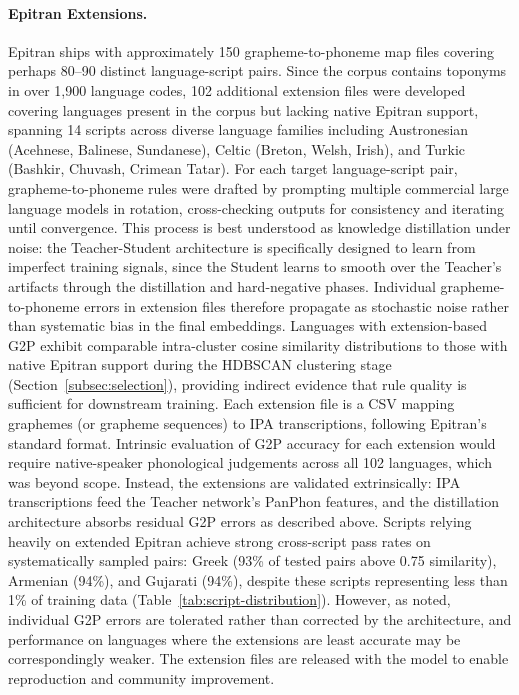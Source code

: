 \documentclass[11pt,a4paper]{article}
\begin{document}
\paragraph{Epitran Extensions.} Epitran ships with approximately 150 grapheme-to-phoneme map files covering perhaps 80--90 distinct language-script pairs. Since the corpus contains toponyms in over 1,900 language codes, 102 additional extension files were developed covering languages present in the corpus but lacking native Epitran support, spanning 14 scripts across diverse language families including Austronesian (Acehnese, Balinese, Sundanese), Celtic (Breton, Welsh, Irish), and Turkic (Bashkir, Chuvash, Crimean Tatar). For each target language-script pair, grapheme-to-phoneme rules were drafted by prompting multiple commercial large language models in rotation, cross-checking outputs for consistency and iterating until convergence. This process is best understood as knowledge distillation under noise: the Teacher-Student architecture is specifically designed to learn from imperfect training signals, since the Student learns to smooth over the Teacher's artifacts through the distillation and hard-negative phases. Individual grapheme-to-phoneme errors in extension files therefore propagate as stochastic noise rather than systematic bias in the final embeddings. Languages with extension-based G2P exhibit comparable intra-cluster cosine similarity distributions to those with native Epitran support during the HDBSCAN clustering stage (Section~\ref{subsec:selection}), providing indirect evidence that rule quality is sufficient for downstream training. Each extension file is a CSV mapping graphemes (or grapheme sequences) to IPA transcriptions, following Epitran's standard format. Intrinsic evaluation of G2P accuracy for each extension would require native-speaker phonological judgements across all 102 languages, which was beyond scope. Instead, the extensions are validated extrinsically: IPA transcriptions feed the Teacher network's PanPhon features, and the distillation architecture absorbs residual G2P errors as described above. Scripts relying heavily on extended Epitran achieve strong cross-script pass rates on systematically sampled pairs: Greek (93\% of tested pairs above 0.75 similarity), Armenian (94\%), and Gujarati (94\%), despite these scripts representing less than 1\% of training data (Table~\ref{tab:script-distribution}). However, as noted, individual G2P errors are tolerated rather than corrected by the architecture, and performance on languages where the extensions are least accurate may be correspondingly weaker. The extension files are released with the model to enable reproduction and community improvement.
\end{document}
